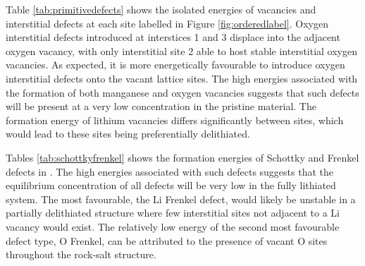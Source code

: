 \clearpage
\noindent
Table \ref{tab:primitivedefects} shows the isolated energies of vacancies and interstitial defects at each site labelled in Figure \ref{fig:orderedlabel}.
Oxygen interstitial defects introduced at interstices 1 and 3 displace into the adjacent oxygen vacancy, with only interstitial site 2 able to host stable interstitial oxygen vacancies.
As expected, it is more energetically favourable to introduce oxygen interstitial defects onto the vacant lattice sites.
The high energies associated with the formation of both manganese and oxygen vacancies suggests that such defects will be present at a very low concentration in the pristine material.
The formation energy of lithium vacancies differs significantly between sites, which would lead to these sites being preferentially delithiated.

\begin{table}[t]
\centering
\caption{Schottky and Frenkel defect energies in }
\label{tab:schottkyfrenkel}
\end{table}

\noindent
Tables \ref{tab:schottkyfrenkel} shows the formation energies of Schottky and Frenkel defects in .
The high energies associated with such defects suggests that the equilibrium concentration of all defects will be very low in the fully lithiated system.
The most favourable, the Li Frenkel defect, would likely be unstable in a partially delithiated structure where few interstitial sites not adjacent to a Li vacancy would exist.
The relatively low energy of the second most favourable defect type, O Frenkel, can be attributed to the presence of vacant O sites throughout the rock-salt structure.

